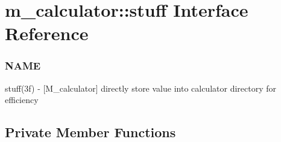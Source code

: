 \hypertarget{interfacem__calculator_1_1stuff}{}\section{m\+\_\+calculator\+:\+:stuff Interface Reference}
\label{interfacem__calculator_1_1stuff}


\subsubsection*{N\+A\+ME}

stuff(3f) -\/ \mbox{[}M\+\_\+calculator\mbox{]} directly store value into calculator directory for efficiency  


\subsection*{Private Member Functions}
